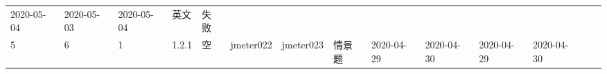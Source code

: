 \documentclass[hyperref, a4paper]{ctexart}
\begin{document}
\begin{longtable}[]{@{}llllllllllllll@{}}
\begin{minipage}[t]{0.05\columnwidth}
2020-05-04\strut
\end{minipage} & \begin{minipage}[t]{0.07\columnwidth}\raggedright
2020-05-03\strut
\end{minipage} & \begin{minipage}[t]{0.08\columnwidth}\raggedright
2020-05-04\strut
\end{minipage} & \begin{minipage}[t]{0.04\columnwidth}\raggedright
英文\strut
\end{minipage} & \begin{minipage}[t]{0.02\columnwidth}\raggedright
失败\strut
\end{minipage}\tabularnewline
\begin{minipage}[t]{0.01\columnwidth}\raggedright
5\strut
\end{minipage} & \begin{minipage}[t]{0.12\columnwidth}\raggedright
6\strut
\end{minipage} & \begin{minipage}[t]{0.03\columnwidth}\raggedright
1\strut
\end{minipage} & \begin{minipage}[t]{0.06\columnwidth}\raggedright
1.2.1\strut
\end{minipage} & \begin{minipage}[t]{0.04\columnwidth}\raggedright
空\strut
\end{minipage} & \begin{minipage}[t]{0.04\columnwidth}\raggedright
jmeter022\strut
\end{minipage} & \begin{minipage}[t]{0.04\columnwidth}\raggedright
jmeter023\strut
\end{minipage} & \begin{minipage}[t]{0.02\columnwidth}\raggedright
情景题\strut
\end{minipage} & \begin{minipage}[t]{0.04\columnwidth}\raggedright
2020-04-29\strut
\end{minipage} & \begin{minipage}[t]{0.05\columnwidth}\raggedright
2020-04-30\strut
\end{minipage} & \begin{minipage}[t]{0.07\columnwidth}\raggedright
2020-04-29\strut
\end{minipage} & \begin{minipage}[t]{0.08\columnwidth}\raggedright
2020-04-30\strut
\end{minipage} & \begin{minipage}[t]{0.04\columnwidth}\raggedright

\end{minipage}
\end{longtable}
\end{document}
